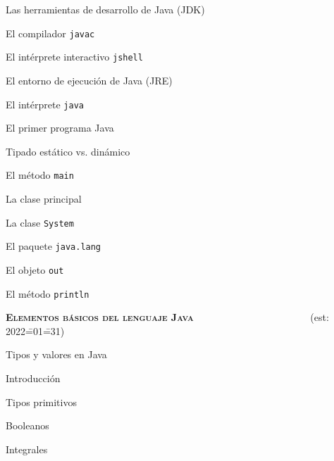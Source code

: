 \begin{longenum}
\begin{longenum}
\begin{longenum}
\begin{longenum}
            \end{longenum}
            \item Las herramientas de desarrollo de Java (JDK)
            \begin{longenum}
                \item El compilador \texttt{javac}
                \item El intérprete interactivo \texttt{jshell}
            \end{longenum}
            \item El entorno de ejecución de Java (JRE)
            \begin{longenum}
                \item El intérprete \texttt{java}
            \end{longenum}
        \end{longenum}
        \item El primer programa Java
        \begin{longenum}
            \item Tipado estático vs. dinámico
            \item El método \texttt{main}
            \item La clase principal
            \item La clase \texttt{System}
            \item El paquete \texttt{java.lang}
            \item El objeto \texttt{out}
            \item El método \texttt{println}
        \end{longenum}
    \end{longenum}
    \item \textbf{\textsc{Elementos básicos del lenguaje Java}} \ \ \ \ \ \ \ \ \ \ \ \ \ \ \ \ \ \ \ \ \ \ \ (est: 2022\==01\==31)
    \begin{longenum}
        \item Tipos y valores en Java
        \begin{longenum}
            \item Introducción
            \item Tipos primitivos
            \begin{longenum}
                \item Booleanos
                \item Integrales

\end{longenum}
\end{longenum}
\end{longenum}
\end{longenum}
